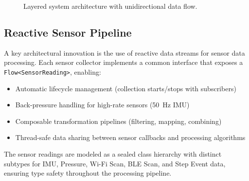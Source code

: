 \documentclass[journal,twocolumn]{IEEEtran}
\begin{document}
\begin{figure}[htbp]
\centering
{}
\caption{Layered system architecture with unidirectional data flow.}
\label{fig:architecture}
\end{figure}

\subsection{Reactive Sensor Pipeline}

A key architectural innovation is the use of reactive data streams for sensor data processing. Each sensor collector implements a common interface that exposes a \texttt{Flow<SensorReading>}, enabling:
\begin{itemize}
    \item Automatic lifecycle management (collection starts/stops with subscribers)
    \item Back-pressure handling for high-rate sensors (50~Hz IMU)
    \item Composable transformation pipelines (filtering, mapping, combining)
    \item Thread-safe data sharing between sensor callbacks and processing algorithms
\end{itemize}

The sensor readings are modeled as a sealed class hierarchy with distinct subtypes for IMU, Pressure, Wi-Fi Scan, BLE Scan, and Step Event data, ensuring type safety throughout the processing pipeline.
\end{document}

